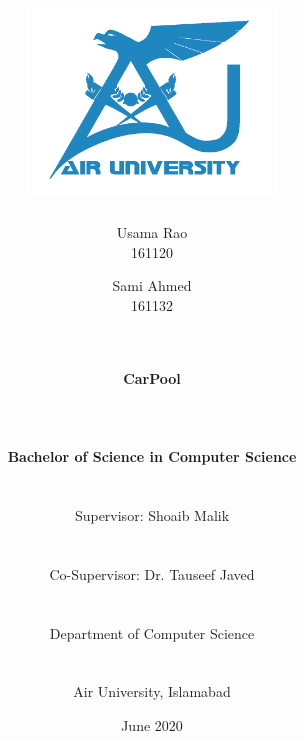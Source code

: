 \documentclass[12pt,a4paper]{report}
\begin{document}
\title{\includegraphics[width=0.5\textwidth]{AU-Logo.png}\\}

\author{
	Usama Rao \\ 161120 \and
	
	Sami Ahmed \\ 161132  \and
	
	\\\\
	
	\textbf{\Large CarPool}
	
	\\\\\\
	
	\textbf{\large Bachelor of Science in Computer Science}
	
	\\\\
	
	{\normalsize Supervisor: Shoaib Malik}
	
	\\\\
	
	{\normalsize Co-Supervisor: Dr. Tauseef Javed}
	
	\\\\
	
	{\normalsize Department of Computer Science}
	
	\\\\
	
	{\normalsize Air University, Islamabad}
	
	\date{\normalsize June 2020}
}

\maketitle

\thispagestyle{empty}

\cleardoublepage

\newpage 
\end{document}
